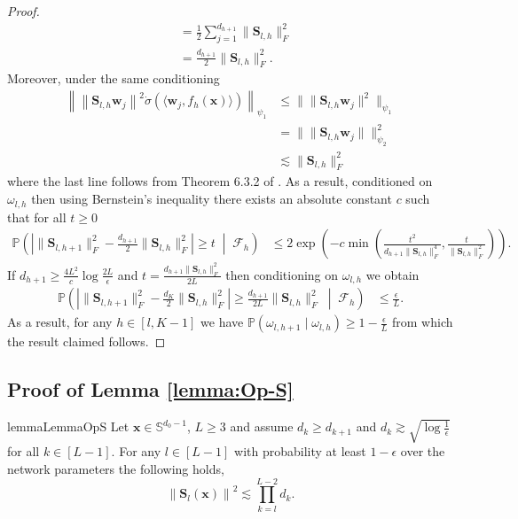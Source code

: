 \documentclass{article}
\theoremstyle{definition}
\renewcommand{\P}{\mathbb{P}}
\newcommand{\mc}{\mathcal}
\renewcommand{\S}{\mathbb{S}}
\def\vw{{\bm{w}}}
\def\vx{{\bm{x}}}
\def\mS{{\bm{S}}}
\begin{document}
\begin{proof}
\begin{align*}
        &= \frac{1}{2}\sum_{j = 1}^{d_{h+1}}\|\mS_{l, h}\|_F^2\\
        &= \frac{d_{h+1}}{2}\|\mS_{l, h}\|_F^2.
    \end{align*}
    Moreover, under the same conditioning
    \begin{align*}
        \left\|\left\|\mS_{l, h}\vw_j\right\|^2 \dot{\sigma}(\langle \vw_j, f_{h}(\vx) \rangle)  \right\|_{\psi_1} &\leq \| \|\mS_{l, h}\vw_j\|^2 \|_{\psi_1}\\
        &= \| \|\mS_{l, h}\vw_j\| \|_{\psi_2}^2\\
        &\lesssim \|\mS_{l, h}\|_F^2
    \end{align*}
   where the last line follows from Theorem 6.3.2 of \cite{vershynin2018high}. As a result, conditioned on $\omega_{l,h}$ then using Bernstein's inequality \cite[Theorem 2.8.1]{vershynin2018high} there exists an absolute constant $c$ such that for all $t \geq 0$ 
    \begin{align*}
        \P\left(\left|\|\mS_{l, h+1}\|_F^2 -\frac{d_{h+1}}{2}\|\mS_{l, h}\|_F^2\right| \geq  t \; \middle| \; \mc{F}_{h} \right) &\leq 2\exp\left(-c \min\left(\frac{t^2}{d_{h+1}\|\mS_{l, h}\|_F^4 }, \frac{t}{\|\mS_{l, h}\|_F^2} \right) \right).
    \end{align*}
    If $d_{h+1} \geq \frac{4L^2}{c} \log \frac{2L}{\epsilon}$ and $t = \frac{d_{h+1}\|\mS_{l, h}\|_F^2 }{2L }$ then conditioning on $\omega_{l,h}$ we obtain
    \begin{align*}
        \P\left(\left|\|\mS_{l, h+1}\|_F^2 -\frac{d_K}{2}\|\mS_{l, h}\|_F^2\right| \geq  \frac{d_{h+1} }{2L}\|\mS_{l, h}\|_F^2 \; \middle| \; \mc{F}_{h} \right) &\leq \frac{\epsilon}{L}.
    \end{align*}
    As a result, for any $h \in [l, K-1]$ we have $\P(\omega_{l, h+1} \mid \omega_{l,h }) \geq 1 - \tfrac{\epsilon}{L}$ from which the result claimed follows.
\end{proof}


\subsection{Proof of Lemma \ref{lemma:Op-S}} \label{app:Op-S}


\begin{restatable}{lemma}{LemmaOpS}\label{lemma:Op-S}
    Let $\vx \in \S^{d_0-1}$, $L \geq 3$ and assume $d_k \geq d_{k + 1}$ and $d_k \gtrsim  \sqrt{\log \frac{1}{\epsilon} }$ for all $k \in [L - 1]$. For any $l \in [L-1]$ with probability at least $1 - \epsilon$ over the network parameters the following holds,
    \[
    \left\| \mS_l(\vx) \right\|^2 \lesssim \prod_{k = l}^{L - 2}d_{k}.
    \]
\end{restatable}
\end{document}
